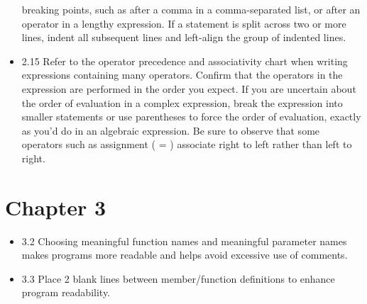 \documentclass[11pt]{article}
\begin{document}
\begin{itemize}
breaking points, such as after a comma in a comma-separated list, or
after an operator in a lengthy expression. If a statement is split
across two or more lines, indent all subsequent lines and left-align
the group of indented lines.
\item 2.15 Refer to the operator precedence and associativity chart when
writing expressions containing many operators. Confirm that the
operators in the expression are performed in the order you
expect. If you are uncertain about the order of evaluation in a
complex expression, break the expression into smaller statements or
use parentheses to force the order of evaluation, exactly as you’d
do in an algebraic expression. Be sure to observe that some
operators such as assignment ( = ) associate right to left rather
than left to right.
\end{itemize}
\section*{Chapter 3}
\label{sec-3}
\begin{itemize}
\item 3.2 Choosing meaningful function names and meaningful parameter
names makes programs more readable and helps avoid excessive use of
comments.
\item 3.3 Place 2 blank lines between member/function definitions to
enhance program readability.
\end{itemize}
\end{document}
